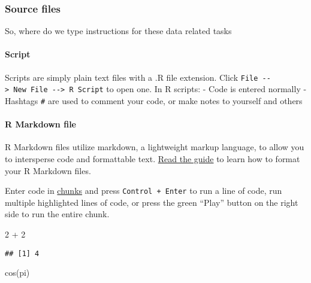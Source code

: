 \documentclass[
]{article}
\newenvironment{Shaded}{\begin{snugshade}}{\end{snugshade}}
\newcommand{\DecValTok}[1]{\textcolor[rgb]{0.00,0.00,0.81}{#1}}
\newcommand{\FunctionTok}[1]{\textcolor[rgb]{0.00,0.00,0.00}{#1}}
\newcommand{\NormalTok}[1]{#1}
\newcommand{\SpecialCharTok}[1]{\textcolor[rgb]{0.00,0.00,0.00}{#1}}
\begin{document}
\hypertarget{source-files}{%
\subsubsection{Source files}\label{source-files}}

So, where do we type instructions for these data related tasks

\hypertarget{script}{%
\paragraph{Script}\label{script}}

Scripts are simply plain text files with a .R file extension. Click
\texttt{File\ -\/-\textgreater{}\ New\ File\ -\/-\textgreater{}\ R\ Script}
to open one. In R scripts: - Code is entered normally - Hashtags
\texttt{\#} are used to comment your code, or make notes to yourself and
others

\hypertarget{r-markdown-file}{%
\paragraph{R Markdown file}\label{r-markdown-file}}

R Markdown files utilize markdown, a lightweight markup language, to
allow you to intersperse code and formattable text.
\href{https://rmarkdown.rstudio.com/lesson-1.html}{Read the guide} to
learn how to format your R Markdown files.

Enter code in \href{https://rmarkdown.rstudio.com/lesson-3.html}{chunks}
and press \texttt{Control\ +\ Enter} to run a line of code, run multiple
highlighted lines of code, or press the green ``Play'' button on the
right side to run the entire chunk.

\begin{Shaded}
\begin{Highlighting}[]
\DecValTok{2} \SpecialCharTok{+} \DecValTok{2}
\end{Highlighting}
\end{Shaded}

\begin{verbatim}
## [1] 4
\end{verbatim}

\begin{Shaded}
\begin{Highlighting}[]
\FunctionTok{cos}\NormalTok{(pi)}
\end{Highlighting}
\end{Shaded}
\end{document}
